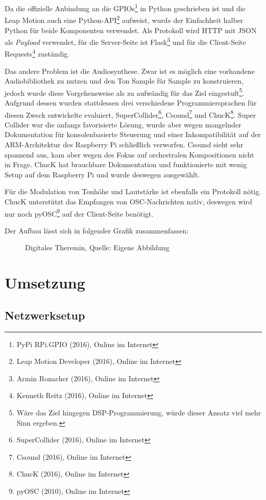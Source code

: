 \documentclass[a4paper, fontsize=12pt, toc=bibliographynumbered]{scrreprt}
\newcommand{\abbildung}[3]{\begin{figure}[H]\centering
    \fbox{\texttt{[image: \#2]}}\caption{#3}
    \label{fig:#2}\end{figure}}
\begin{document}
Da die offizielle Anbindung an die GPIOs\footnote{PyPi RPi.GPIO
  (2016), Online im Internet} in Python geschrieben ist und die Leap
Motion auch eine Python-\ac{API}\footnote{Leap Motion Developer
  (2016), Online im Internet} aufweist, wurde der Einfachheit halber
Python für beide Komponenten verwendet.  Als Protokoll wird \ac{HTTP}
mit \ac{JSON} als \emph{Payload} verwendet, für die Server-Seite ist
Flask\footnote{Armin Ronacher (2016), Online im Internet} und für die
Client-Seite Requests\footnote{Kenneth Reitz (2016), Online im
  Internet} zuständig.

Das andere Problem ist die Audiosynthese.  Zwar ist es möglich eine
vorhandene Audiobibliothek zu nutzen und den Ton Sample für Sample zu
konstruieren, jedoch wurde diese Vorgehensweise als zu aufwändig für
das Ziel eingestuft\footnote{Wäre das Ziel hingegen
  DSP-Programmierung, würde dieser Ansatz viel mehr Sinn ergeben.}.
Aufgrund dessen wurden stattdessen drei verschiedene
Programmiersprachen für diesen Zweck entwickelte evaluiert,
SuperCollider\footnote{SuperCollider (2016), Online im Internet},
Csound\footnote{Csound (2016), Online im Internet} und
ChucK\footnote{ChucK (2016), Online im Internet}.  Super Collider war
die anfangs favorisierte Lösung, wurde aber wegen mangelnder
Dokumentation für konsolenbasierte Steuerung und einer
Inkompatibilität auf der ARM-Architektur des Raspberry Pi schließlich
verworfen.  Csound sieht sehr spannend aus, kam aber wegen des Fokus
auf orchestralen Kompositionen nicht in Frage.  ChucK hat brauchbare
Dokumentation und funktionierte mit wenig Setup auf dem Raspberry Pi
und wurde deswegen ausgewählt.

Für die Modulation von Tonhöhe und Lautstärke ist ebenfalls ein
Protokoll nötig.  ChucK unterstützt das Empfangen von
\ac{OSC}-Nachrichten nativ, deswegen wird nur noch
pyOSC\footnote{pyOSC (2010), Online im Internet} auf der Client-Seite
benötigt.

Der Aufbau lässt sich in folgender Grafik zusammenfassen:

\abbildung{0.8}{digitales-theremin}{Digitales Theremin, Quelle: Eigene Abbildung}

\chapter{Umsetzung}

\section{Netzwerksetup}
\end{document}
